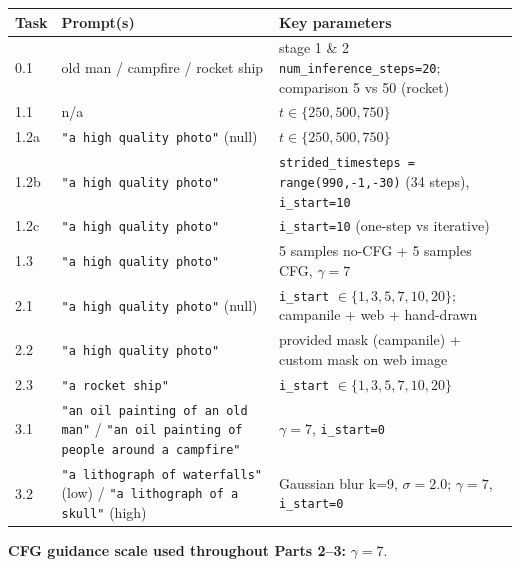 \documentclass[11pt]{article}
\begin{document}
\begin{longtable}{p{} p{} p{}}
\toprule
\textbf{Task} & \textbf{Prompt(s)} & \textbf{Key parameters} \\
\midrule
\endhead
0.1 & old man / campfire / rocket ship & stage 1 \& 2 \texttt{num\_inference\_steps=20}; comparison 5 vs 50 (rocket) \\
1.1 & n/a & $t \in \{250, 500, 750\}$ \\
1.2a & \texttt{"a high quality photo"} (null) & $t \in \{250, 500, 750\}$ \\
1.2b & \texttt{"a high quality photo"} & \texttt{strided\_timesteps = range(990,-1,-30)} (34 steps), \texttt{i\_start=10} \\
1.2c & \texttt{"a high quality photo"} & \texttt{i\_start=10} (one-step vs iterative) \\
1.3 & \texttt{"a high quality photo"} & 5 samples no-CFG + 5 samples CFG, $\gamma=7$ \\
2.1 & \texttt{"a high quality photo"} (null) & \texttt{i\_start} $\in \{1,3,5,7,10,20\}$; campanile + web + hand-drawn \\
2.2 & \texttt{"a high quality photo"} & provided mask (campanile) + custom mask on web image \\
2.3 & \texttt{"a rocket ship"} & \texttt{i\_start} $\in \{1,3,5,7,10,20\}$ \\
3.1 & \texttt{"an oil painting of an old man"} / \texttt{"an oil painting of people around a campfire"} & $\gamma=7$, \texttt{i\_start=0} \\
3.2 & \texttt{"a lithograph of waterfalls"} (low) / \texttt{"a lithograph of a skull"} (high) & Gaussian blur k=9, $\sigma=2.0$; $\gamma=7$, \texttt{i\_start=0} \\
\bottomrule
\end{longtable}

\textbf{CFG guidance scale used throughout Parts 2--3:} $\gamma = 7$.
\end{document}
